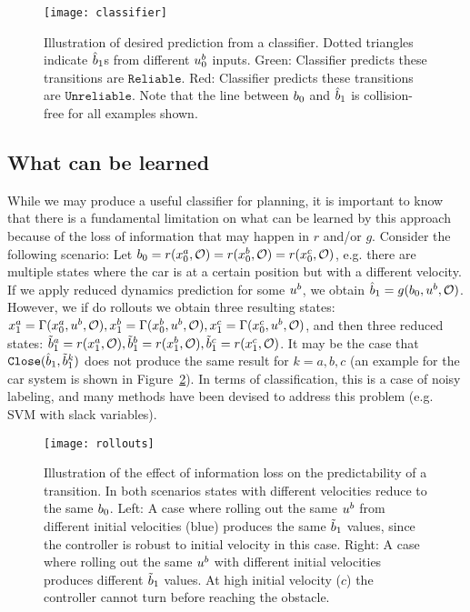 \begin{figure}[h]
    \centering
    \texttt{[image: classifier]}
    \caption{Illustration of desired prediction from a classifier. Dotted triangles indicate $\hat{b}_1$s from different $u^b_0$ inputs. Green: Classifier predicts these transitions are $\texttt{Reliable}$. Red: Classifier predicts these transitions are $\texttt{Unreliable}$. Note that the line between $b_0$ and $\hat{b}_1$ is collision-free for all examples shown.}
    \label{fig:classifier}
\end{figure}

\subsection{What can be learned}

While we may produce a useful classifier for planning, it is important to know that there is a fundamental limitation on what can be learned by this approach because of the loss of information that may happen in $r$ and/or $g$. Consider the following scenario: Let $b_0 = r(x_0^a,\mathcal{O}) = r(x_0^b,\mathcal{O}) = r(x_0^c,\mathcal{O})$, e.g. there are multiple states where the car is at a certain position but with a different velocity. If we apply reduced dynamics prediction for some $u^b$, we obtain $\hat{b}_1 = g(b_0,u^b,\mathcal{O})$. However, we if do rollouts we obtain three resulting states: $x_1^a = \Gamma(x_0^a,u^b,\mathcal{O}), x_1^b = \Gamma(x_0^b,u^b,\mathcal{O}), x_1^c = \Gamma(x_0^c,u^b,\mathcal{O})$, and then three reduced states: $\tilde{b}_1^a = r(x_1^a,\mathcal{O}),\tilde{b}_1^b = r(x_1^b,\mathcal{O}), \tilde{b}_1^c = r(x_1^c,\mathcal{O})$. It may be the case that $\texttt{Close}(\hat{b}_1, \tilde{b}_1^k)$ does not produce the same result for $k={a,b,c}$ (an example for the car system is shown in Figure~\ref{fig:cars}). In terms of classification, this is a case of noisy labeling, and many methods have been devised to address this problem (e.g. SVM with slack variables). 

\begin{figure}[h]
    \centering
    \texttt{[image: rollouts]}
    \caption{Illustration of the effect of information loss on the predictability of a transition. In both scenarios states with different velocities reduce to the same $b_0$. Left: A case where rolling out the same $u^b$ from different initial velocities (blue) produces the same $\tilde{b}_1$ values, since the controller is robust to initial velocity in this case. Right: A case where rolling out the same $u^b$ with different initial velocities produces different $\tilde{b}_1$ values. At high initial velocity ($c$) the controller cannot turn before reaching the obstacle.}
    \label{fig:cars}
\end{figure}

